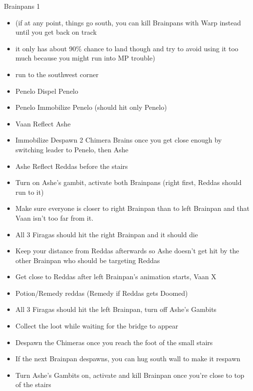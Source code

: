 \begin{gambit}
	\begin{itemize}
	\end{itemize}
\end{gambit}
\begin{battle}{Brainpans 1}
	\begin{itemize}
		\item (if at any point, things go south, you can kill Brainpans with Warp instead until you get back on track \item  it only has about 90\% chance to land though and try to avoid using it too much because you might run into MP trouble)
		\item  run to the southwest corner
		\item  Penelo Dispel Penelo
		\item  Penelo Immobilize Penelo (should hit only Penelo)
		\item  Vaan Reflect Ashe
		\item  Immobilize Despawn 2 Chimera Brains once you get close enough by switching leader to Penelo, then Ashe
		\item  Ashe Reflect Reddas before the stairs
		\item  Turn on Ashe's gambit, activate both Brainpans (right first, Reddas should run to it)
		\item  Make sure everyone is closer to right Brainpan than to left Brainpan and that Vaan isn't too far from it.
		\item  All 3 Firagas should hit the right Brainpan and it should die
		\item  Keep your distance from Reddas afterwards so Ashe doesn't get hit by the other Brainpan who should be targeting Reddas
		\item  Get close to Reddas after left Brainpan's animation starts, Vaan X\item Potion/Remedy reddas (Remedy if Reddas gets Doomed)
		\item  All 3 Firagas should hit the left Brainpan, turn off Ashe's Gambits
		\item  Collect the loot while waiting for the bridge to appear
		\item  Despawn the Chimeras once you reach the foot of the small stairs
		\item  If the next Brainpan despawns, you can hug south wall to make it respawn
		\item  Turn Ashe's Gambits on, activate and kill Brainpan once you're close to top of the stairs

\end{itemize}
\end{battle}
